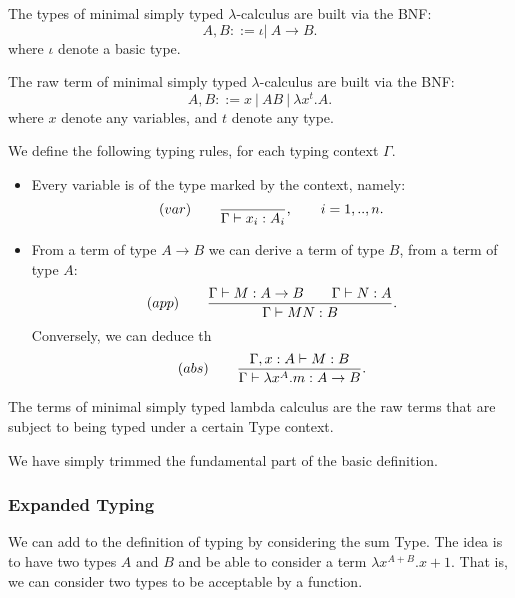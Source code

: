 \begin{definition}
  The types of minimal simply typed $\lambda$-calculus are built via the BNF:
  $$A,B ::= \iota |\ A\to B.$$
  where $\iota$ denote a basic type. 
\end{definition}



\begin{definition}
  The raw term of minimal simply typed $\lambda$-calculus are built via the BNF:
  $$A,B ::= x\ |\ AB\ |\ \lambda x^t.A.$$
  where $x$ denote any variables, and $t$ denote any type. 
\end{definition}



\begin{definition}\label{def:typing-rules}
  We define the following typing rules, for each typing context $\Gamma$.
  \begin{itemize}
    \item Every variable is of the type marked by the context, namely:
$$  (var)\qquad  {\displaystyle \over \Gamma \vdash x_i:A_i},\qquad  i=  1,..,n.$$

\item From a term of type $A\to B$ we can derive a term of type $B$, from a term of type $A$:
  $$(app)\qquad  {\displaystyle \Gamma \vdash M:A\to B\qquad \Gamma \vdash N:A      \over \Gamma \vdash MN:B}.$$
  Conversely, we can deduce th
  $$(abs)\qquad  {\displaystyle \Gamma, x: A\vdash M: B  \over \Gamma \vdash \lambda x^A.m:A\to B}.$$
  \end{itemize}
\end{definition}

\begin{definition}
  The terms of minimal simply typed lambda calculus are the raw terms that are subject to being typed under a certain Type context.
\end{definition}
\begin{remark}
  We have simply trimmed the fundamental part of the basic definition.
\end{remark}
\subsubsection{Expanded Typing}
We can add to the definition of typing by considering the sum Type. The idea is to have two types $A$ and $B$ and be able to consider a term $\lambda x^{A+B}. x+1$. That is, we can consider two types to be acceptable by a function. 

